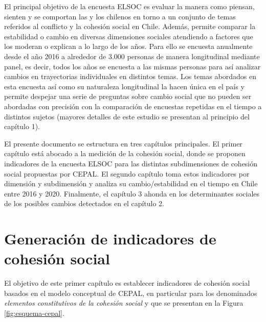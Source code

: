 \documentclass[
  12pt,
]{book}
\begin{document}
El principal objetivo de la encuesta ELSOC es evaluar la manera como piensan, sienten y se comportan las y los chilenos en torno a un conjunto de temas referidos al conflicto y la cohesión social en Chile. Además, permite comparar la estabilidad o cambio en diversas dimensiones sociales atendiendo a factores que los moderan o explican a lo largo de los años. Para ello se encuesta anualmente desde el año 2016 a alrededor de 3.000 personas de manera longitudinal mediante panel, es decir, todos los años se encuesta a las mismas personas para así analizar cambios en trayectorias individuales en distintos temas. Los temas abordados en esta encuesta así como su naturaleza longitudinal la hacen única en el país y permite despejar una serie de preguntas sobre cambio social que no pueden ser abordadas con precisión con la comparación de encuestas repetidas en el tiempo a distintos sujetos (mayores detalles de este estudio se presentan al principio del capítulo 1).

El presente documento se estructura en tres capítulos principales. El primer capítulo está abocado a la medición de la cohesión social, donde se proponen indicadores de la encuesta ELSOC para las distintas subdimensiones de cohesión social propuestas por CEPAL. El segundo capítulo toma estos indicadores por dimensión y subdimensión y analiza su cambio/estabilidad en el tiempo en Chile entre 2016 y 2020. Finalmente, el capítulo 3 ahonda en los determinantes sociales de los posibles cambios detectados en el capítulo 2.

\hypertarget{generaciuxf3n-de-indicadores-de-cohesiuxf3n-social}{%
\chapter{Generación de indicadores de cohesión social}\label{generaciuxf3n-de-indicadores-de-cohesiuxf3n-social}}

El objetivo de este primer capítulo es establecer indicadores de cohesión social basados en el modelo conceptual de CEPAL, en particular para los denominados \emph{elementos constitutivos de la cohesión social} y que se presentan en la Figura \ref{fig:esquema-cepal}.
\end{document}
